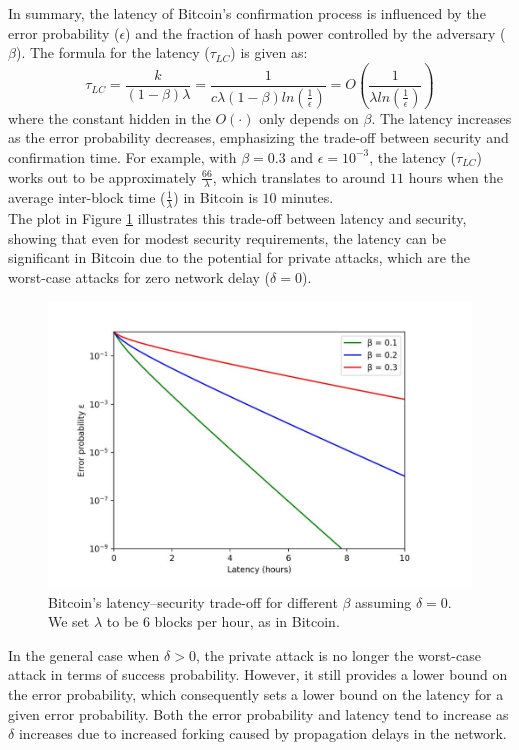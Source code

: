 In summary, the latency of Bitcoin's confirmation process is influenced by the error probability ($\epsilon$) and the fraction of hash power controlled by the adversary ($\beta$). The formula for the latency ($\tau_{LC}$) is given as:
\begin{equation*}
    \tau_{LC} = \frac{k}{(1 - \beta)\lambda } = \frac{1}{c \lambda (1 - \beta) ln(\frac{1}{\epsilon})} = O(\frac{1}{\lambda ln(\frac{1}{\epsilon})})
\end{equation*}
where the constant hidden in the $O(·)$ only depends on $\beta$. The latency increases as the error probability decreases, emphasizing the trade-off between security and confirmation time.
For example, with $\beta = 0.3$ and $\epsilon = 10^{-3}$, the latency ($\tau_{LC}$) works out to be approximately $\frac{66}{\lambda}$, which translates to around $11$ hours when the average inter-block time ($\frac{1}{\lambda}$) in Bitcoin is $10$ minutes.\\
The plot in Figure \ref{fig:f1} illustrates this trade-off between latency and security, showing that even for modest security requirements, the latency can be significant in Bitcoin due to the potential for private attacks, which are the worst-case attacks for zero network delay ($\delta = 0$).
\begin{center}
    \begin{figure}
        \centering
        \includegraphics[width=0.8\linewidth]{Fig/09/F1}
        \caption{Bitcoin’s latency–security trade-oﬀ for different $\beta$ assuming $\delta = 0$. We set $\lambda$ to be $6$ blocks per hour, as in Bitcoin.}
        \label{fig:f1}
    \end{figure}
\end{center}
In the general case when $\delta > 0$, the private attack is no longer the worst-case attack in terms of success probability. However, it still provides a lower bound on the error probability, which consequently sets a lower bound on the latency for a given error probability. Both the error probability and latency tend to increase as $\delta$ increases due to increased forking caused by propagation delays in the network.\\
